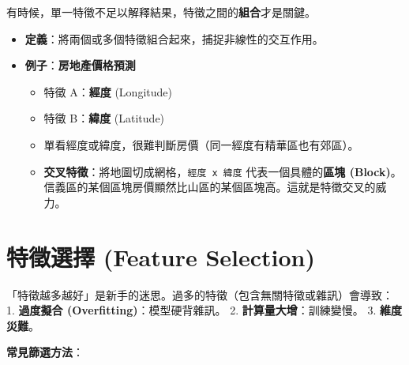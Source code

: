\documentclass[
  letterpaper,
  DIV=11,
  numbers=noendperiod]{scrreprt}
\providecommand{\tightlist}{%
  \setlength{\itemsep}{0pt}\setlength{\parskip}{0pt}}
\begin{document}
有時候，單一特徵不足以解釋結果，特徵之間的\textbf{組合}才是關鍵。

\begin{itemize}
\tightlist
\item
  \textbf{定義}：將兩個或多個特徵組合起來，捕捉非線性的交互作用。
\item
  \textbf{例子}：\textbf{房地產價格預測}

  \begin{itemize}
  \tightlist
  \item
    特徵 A：\textbf{經度} (Longitude)
  \item
    特徵 B：\textbf{緯度} (Latitude)
  \item
    單看經度或緯度，很難判斷房價（同一經度有精華區也有郊區）。
  \item
    \textbf{交叉特徵}：將地圖切成網格，\texttt{經度\ x\ 緯度}
    代表一個具體的\textbf{區塊
    (Block)}。信義區的某個區塊房價顯然比山區的某個區塊高。這就是特徵交叉的威力。
  \end{itemize}
\end{itemize}

\section{特徵選擇 (Feature
Selection)}\label{ux7279ux5fb5ux9078ux64c7-feature-selection}

「特徵越多越好」是新手的迷思。過多的特徵（包含無關特徵或雜訊）會導致：
1. \textbf{過度擬合 (Overfitting)}：模型硬背雜訊。 2.
\textbf{計算量大增}：訓練變慢。 3. \textbf{維度災難}。

\textbf{常見篩選方法}：
\end{document}
